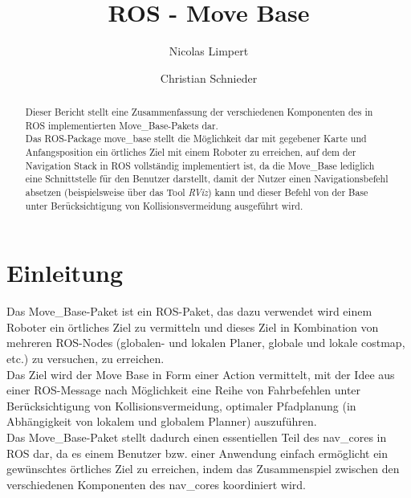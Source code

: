 \documentclass[oribibl]{llncs}
\begin{document}
 \title{ROS - Move Base}

\author{Nicolas Limpert \and Christian Schnieder} 

\maketitle


\begin{abstract} Dieser Bericht stellt eine Zusammenfassung der verschiedenen Komponenten des in ROS implementierten Move\_Base-Pakets dar.\\
Das ROS-Package move\_base stellt  die Möglichkeit dar mit gegebener Karte und Anfangsposition ein örtliches Ziel mit einem Roboter zu erreichen, auf dem der Navigation Stack\cite{navigation} in ROS vollständig implementiert ist, da die Move\_Base lediglich eine Schnittstelle für den Benutzer darstellt, damit der Nutzer einen Navigationsbefehl absetzen (beispielsweise über das Tool \textit{RViz}) kann und dieser Befehl von der Base unter Berücksichtigung von Kollisionsvermeidung ausgeführt wird.\end{abstract}

\section{Einleitung}
Das Move\_Base-Paket ist ein ROS-Paket, das dazu verwendet wird einem Roboter ein örtliches Ziel zu vermitteln und dieses Ziel in Kombination von mehreren ROS-Nodes (globalen- und lokalen Planer, globale und lokale costmap, etc.) zu versuchen, zu erreichen.\\
Das Ziel wird der Move Base in Form einer Action vermittelt, mit der Idee aus einer ROS-Message nach Möglichkeit eine Reihe von Fahrbefehlen unter Berücksichtigung von Kollisionsvermeidung, optimaler Pfadplanung (in Abhängigkeit von lokalem und globalem Planner) auszuführen.\\
Das Move\_Base-Paket stellt dadurch einen essentiellen Teil des nav\_cores in ROS dar, da es einem Benutzer bzw. einer Anwendung einfach ermöglicht ein gewünschtes örtliches Ziel zu erreichen, indem das Zusammenspiel zwischen den verschiedenen Komponenten des nav\_cores koordiniert wird.
\end{document}
